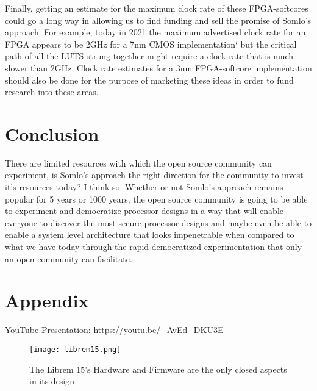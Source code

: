 \documentclass[conference]{IEEEtran}
\begin{document}
Finally, getting an estimate for the maximum clock rate of these FPGA-softcores could go a long way in allowing us to find funding and sell the promise of Somlo’s approach. For example, today in 2021 the maximum advertised clock rate for an FPGA appears to be 2GHz for a 7nm CMOS implementation`\cite{speedster} but the critical path of all the LUTS strung together might require a clock rate that is much slower than 2GHz. Clock rate estimates for a 3nm FPGA-softcore implementation should also be done for the purpose of marketing these ideas  in order to fund research into these areas.

\section{Conclusion}

There are limited resources with which the open source community can experiment, is Somlo’s approach the right direction for the community to invest it’s resources today? I think so. Whether or not Somlo’s approach remains popular for 5 years or 1000 years, the open source community is going to be able to experiment and democratize processor designs in a way that will enable everyone to discover the most secure processor designs and maybe even be able to enable a system level architecture that looks impenetrable when compared to what we have today through the rapid democratized experimentation that only an open community can facilitate.




\section*{Appendix}

YouTube Presentation:
https://youtu.be/\_AvEd\_DKU3E 

\begin{figure*}
\centering
\texttt{[image: librem15.png]}
\caption{The Librem 15's Hardware and Firmware are the only closed aspects in its design~\cite{bunnie}}
\end{figure*}
\end{document}
